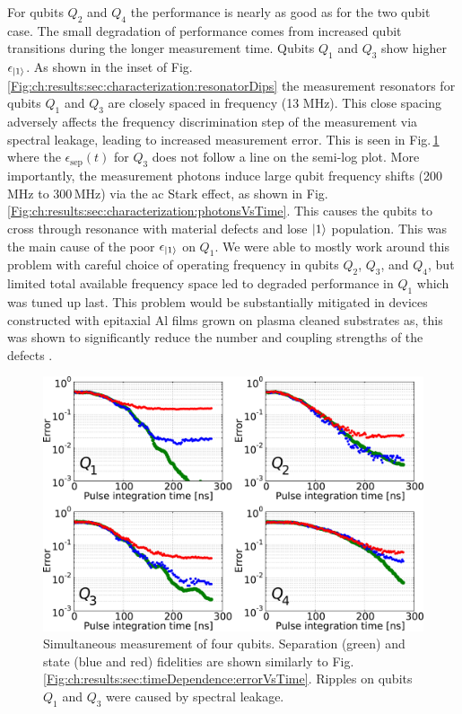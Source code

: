 For qubits $Q_2$ and $Q_4$ the performance is nearly as good as for the two qubit case.
The small degradation of performance comes from increased qubit transitions during the longer measurement time.
Qubits $Q_1$ and $Q_3$ show higher $\epsilon_{|1\rangle}$.
As shown in the inset of Fig.\,\ref{Fig:ch:results:sec:characterization:resonatorDips} the measurement resonators for qubits $Q_1$ and $Q_3$ are closely spaced in frequency (13 MHz).
This close spacing adversely affects the frequency discrimination step of the measurement via spectral leakage, leading to increased measurement error.
This is seen in Fig.\,\ref{Fig:ch:results:sec:timeDependence:fourQubitMultiplexed} where the $\epsilon_{\text{sep}}(t)$ for $Q_3$ does not follow a line on the semi-log plot.
More importantly, the measurement photons induce large qubit frequency shifts (200\,MHz to 300\,MHz) via the ac Stark effect, as shown in Fig.\,\ref{Fig:ch:results:sec:characterization:photonsVsTime}.
This causes the qubits to cross through resonance with material defects and lose $|1\rangle$ population.
This was the main cause of the poor $\epsilon_{|1\rangle}$ on $Q_1$.
We were able to mostly work around this problem with careful choice of operating frequency in qubits $Q_2$, $Q_3$, and $Q_4$, but limited total available frequency space led to degraded performance in $Q_1$ which was tuned up last.
This problem would be substantially mitigated in devices constructed with epitaxial Al films grown on plasma cleaned substrates as, this was shown to significantly reduce the number and coupling strengths of the defects \cite{Megrant:highQ2012}.

\begin{figure}
\begin{centering}
\includegraphics[width=\textwidth]{fourQubitMultiplexed.pdf}
\par\end{centering}
\caption{Simultaneous measurement of four qubits. Separation (green) and state (blue and red) fidelities are shown similarly to Fig.\,\ref{Fig:ch:results:sec:timeDependence:errorVsTime}.
Ripples on qubits $Q_1$ and $Q_3$ were caused by spectral leakage.}
\label{Fig:ch:results:sec:timeDependence:fourQubitMultiplexed}
\end{figure}
